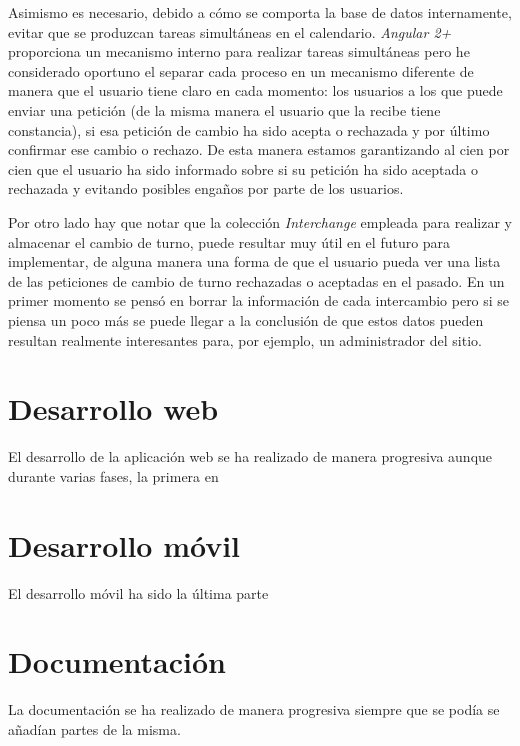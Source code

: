  Asimismo es necesario, debido a cómo se comporta la base de datos internamente, evitar que se produzcan tareas simultáneas en el calendario. \emph{Angular 2+} proporciona un mecanismo interno para realizar tareas simultáneas pero he considerado oportuno el separar cada proceso en un mecanismo diferente de manera que el usuario tiene claro en cada momento: los usuarios a los que puede enviar una petición (de la misma manera el usuario que la recibe tiene constancia), si esa petición de cambio ha sido acepta o rechazada y por último confirmar ese cambio o rechazo. De esta manera estamos garantizando al cien por cien que el usuario ha sido informado sobre si su petición ha sido aceptada o rechazada y evitando posibles engaños por parte de los usuarios.
 
 Por otro lado hay que notar que la colección \emph{Interchange} empleada para realizar y almacenar el cambio de turno, puede resultar muy útil en el futuro para implementar, de alguna manera una forma de que el usuario pueda ver una lista de las peticiones de cambio de turno rechazadas o aceptadas en el pasado. En un primer momento se pensó en borrar la información de cada intercambio pero si se piensa un poco más se puede llegar a la conclusión de que estos datos pueden resultan realmente interesantes para, por ejemplo, un administrador del sitio. 
 

   
   \section{Desarrollo web}\label{dweb}
   
   El desarrollo de la aplicación web se ha realizado de manera progresiva aunque durante varias fases, la primera en 
   
   \section{Desarrollo móvil}\label{dapp}
   
   El desarrollo móvil ha sido la última parte
   
   \section{Documentación}\label{docs}
   
   La documentación se ha realizado de manera progresiva siempre que se podía se añadían partes de la misma. 
   

